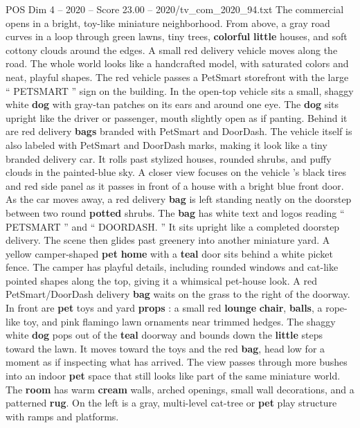 \begin{textsample}{POS Dim 4 – 2020 – Score 23.00 – 2020/tv\_com\_2020\_94.txt}  \label{ex:f4_pos_002}
The commercial opens in a bright, toy-like miniature neighborhood.
From above, a gray road curves in a loop through green lawns, tiny trees, \textbf{colorful} \textbf{little} houses, and soft cottony clouds around the edges.
A small red delivery vehicle moves along the road.
The whole world looks like a handcrafted model, with saturated colors and neat, playful shapes.
The red vehicle passes a PetSmart storefront with the large “ PETSMART ” sign on the building.
In the open-top vehicle sits a small, shaggy white \textbf{dog} with gray-tan patches on its ears and around one eye.
The \textbf{dog} sits upright like the driver or passenger, mouth slightly open as if panting.
Behind it are red delivery \textbf{bags} branded with PetSmart and DoorDash.
The vehicle itself is also labeled with PetSmart and DoorDash marks, making it look like a tiny branded delivery car.
It rolls past stylized houses, rounded shrubs, and puffy clouds in the painted-blue sky.
A closer view focuses on the vehicle ’s black tires and red side panel as it passes in front of a house with a bright blue front door.
As the car moves away, a red delivery \textbf{bag} is left standing neatly on the doorstep between two round \textbf{potted} shrubs.
The \textbf{bag} has white text and logos reading “ PETSMART ” and “ DOORDASH. ” It sits upright like a completed doorstep delivery.
The scene then glides past greenery into another miniature yard.
A yellow camper-shaped \textbf{pet} \textbf{home} with a \textbf{teal} door sits behind a white picket fence.
The camper has playful details, including rounded windows and cat-like pointed shapes along the top, giving it a whimsical pet-house look.
A red PetSmart/DoorDash delivery \textbf{bag} waits on the grass to the right of the doorway.
In front are \textbf{pet} toys and yard \textbf{props} : a small red \textbf{lounge} \textbf{chair}, \textbf{balls}, a rope-like toy, and pink flamingo lawn ornaments near trimmed hedges.
The shaggy white \textbf{dog} pops out of the \textbf{teal} doorway and bounds down the \textbf{little} steps toward the lawn.
It moves toward the toys and the red \textbf{bag}, head low for a moment as if inspecting what has arrived.
The view passes through more bushes into an indoor \textbf{pet} space that still looks like part of the same miniature world.
The \textbf{room} has warm \textbf{cream} walls, arched openings, small wall decorations, and a patterned \textbf{rug}.
On the left is a gray, multi-level cat-tree or \textbf{pet} play structure with ramps and platforms.

\end{textsample}
